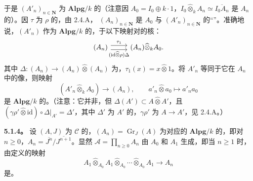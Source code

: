 于是 $(A'_n)_{n\in\mathbf N}$ 为 $\mathbf{Alpg}/k$ 的（注意因 $A_0=I_0\oplus k\cdot1$，$I_0\widehat\otimes_kA_n\simeq\overline{I_0A_n}$ 是 $A_n$ 的）。因 $\tau$ 为 $\rho$ 的，由 2.4.A， $(A_n)_{n\in\mathbf N}$ 是 $A_0$ 与 $(A'_n)_{n\in\mathbf N}$ 的“”。准确地说，$(A'_n)$ 作为 $\mathbf{Alpg}/k$ 的，于以下映射对的核：
\[
\begin{tikzcd}(A_n)\arrow[r,shift left=.7ex,"\tau_1"]\arrow[r,shift right=.7ex,"(\mathrm{id}\widehat\otimes\rho)\Delta"']&(A_n)\widehat\otimes_kA_0.\end{tikzcd}
\]
其中 $\Delta:(A_n)\to(A_n)\widehat\otimes(A_n)$ 为，$\tau_1(x)=x\widehat\otimes1$。将 $A'_n$ 等同于它在 $A_n$ 中的像，则映射
\[(A'_n\widehat\otimes_kA_0)\longrightarrow(A_n),\qquad a'_n\widehat\otimes a_0\longmapsto a'_na_0\]
是 $\mathbf{Alpg}/k$ 的。（注意：它并非，但 $\Delta(A')\subset A\widehat\otimes A'$，且 $(\gamma\rho'\widehat\otimes\mathrm{id})\circ\Delta|_{A'}=\Delta'$，其中 $\Delta'$ 为 $A'$ 的，$\gamma\rho'$ 为 $A\to A'$，见 2.4.A。）

\textbf{5.1.4。} 设 $(A,J)$ 为 $\mathcal C$ 的，$(A_n)=\operatorname{Gr}_J(A)$ 为对应的 $\mathbf{Alpg}/k$ 的，即对 $n\geq0$，$A_n=\overline{J^n}/\overline{J^{n+1}}$。显然 $\mathscr A=\prod_{n\geq0}A_n$ 由 $A_0$ 和 $A_1$ 生成，即当 $n\geq1$ 时，由定义的映射
\[
A_1\widehat\otimes_{A_0}A_1\widehat\otimes_{A_0}\cdots\widehat\otimes_{A_0}A_1\longrightarrow A_n\tag{1}
\]
是。

